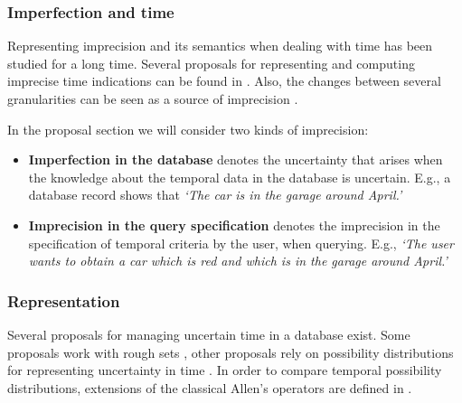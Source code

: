 \subsubsection{Imperfection and time}
Representing imprecision and its semantics when dealing with time has been studied for a long time. Several proposals for representing and computing imprecise time indications can be found in \cite{DeCaluwe1997,DeTre1997}. Also, the changes between several granularities can be seen as a source of imprecision \cite{Devos1998}.

In the proposal section we will consider two kinds of imprecision:
\begin{itemize}
\item \textbf{Imperfection in the database} denotes the uncertainty that arises when the knowledge about the temporal data in the database is uncertain. E.g., a database record shows that \emph{`The car is in the garage around April.'}
 \item \textbf{Imprecision in the query specification} denotes the imprecision in the specification of temporal criteria by the user, when querying. E.g., \emph{`The user wants to obtain a car which is red and which is in the garage around April.'}
\end{itemize}

\subsubsection{Representation}
Several proposals for managing uncertain time in a database exist. Some proposals work with rough sets \cite{Qiang2009}, other proposals rely on possibility distributions for representing uncertainty in time \cite{Dyreson1998,Garrido2009,Galindo2001}. In order to compare temporal possibility distributions, extensions of the classical Allen's operators \cite{Allen1983} are defined in \cite{Ohlbach2004,Nagypal2003,Dubois2003a,Schockaert2008}.



